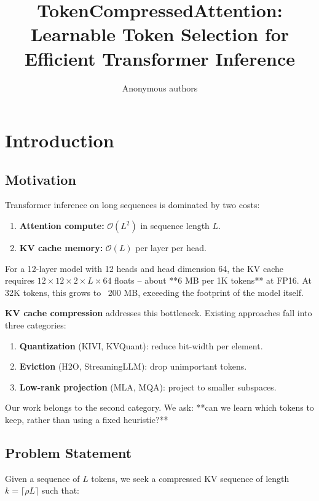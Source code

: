 \title{\textbf{TokenCompressedAttention: Learnable Token Selection for Efficient Transformer Inference}}

\author{Anonymous authors}


\section{Introduction}

\subsection{Motivation}

Transformer inference on long sequences is dominated by two costs:

\begin{enumerate}
\item \textbf{Attention compute:} $\mathcal{O}(L^2)$ in sequence length $L$.
\item \textbf{KV cache memory:} $\mathcal{O}(L)$ per layer per head.

\end{enumerate}
For a 12-layer model with 12 heads and head dimension 64, the KV cache 
requires $12 \times 12 \times 2 \times L \times 64$ floats -- about **6 MB 
per 1K tokens** at FP16. At 32K tokens, this grows to ~200 MB, exceeding 
the footprint of the model itself.

\textbf{KV cache compression} addresses this bottleneck. Existing approaches fall 
into three categories:

\begin{enumerate}
\item \textbf{Quantization} (KIVI, KVQuant): reduce bit-width per element.
\item \textbf{Eviction} (H2O, StreamingLLM): drop unimportant tokens.
\item \textbf{Low-rank projection} (MLA, MQA): project to smaller subspaces.

\end{enumerate}
Our work belongs to the second category. We ask: **can we learn which tokens 
to keep, rather than using a fixed heuristic?**

\subsection{Problem Statement}

Given a sequence of $L$ tokens, we seek a compressed KV sequence of length 
$k = \lceil \rho L \rceil$ such that:

